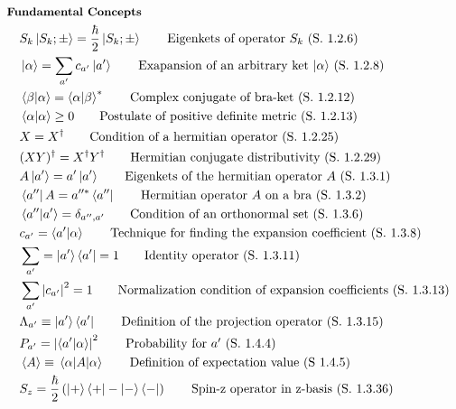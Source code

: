 \documentclass[10pt]{article}
\newcommand{\lrp}[1]{\left( #1 \right)}
\newcommand{\herm}[1]{#1^\dagger}
\begin{document}
\begin{multicols}{2}
	\tiny
	\setlength{\abovedisplayskip}{-25pt}
	\setlength{\belowdisplayskip}{0pt}
	\setlength{\abovedisplayshortskip}{0pt}
	\setlength{\belowdisplayshortskip}{0pt}
	\begin{align*}
	& \small \hspace{-10pt} \textbf{Fundamental Concepts} \small \\
		& S_k\ket{S_k;\pm} = \frac{\hbar}{2} \ket{S_k;\pm}	\tag*{Eigenkets of operator $S_k$	(S. 1.2.6)} \\
		& \ket{\alpha} = \sum_{a'} c_{a'} \ket{a'}	\tag*{Exapansion of an arbitrary ket $\ket{\alpha}$ (S. 1.2.8)} \\
		& \braket{\beta}{\alpha} = \braket{\alpha}{\beta}^*	\tag*{Complex conjugate of bra-ket (S. 1.2.12)} \\
		& \braket{\alpha}{\alpha} \geq 0	\tag*{Postulate of positive definite metric (S. 1.2.13)} \\
		& X = \herm{X}	\tag*{Condition of a hermitian operator (S. 1.2.25)} \\
		& \herm{(X Y)} = \herm{X} \herm{Y}	\tag*{Hermitian conjugate distributivity (S. 1.2.29)} \\
		& A \ket{a'} = a' \ket{a'}	\tag*{Eigenkets of the hermitian operator $A$ (S. 1.3.1)} \\
		& \bra{a''}A = a''^* \bra{a''}	\tag*{Hermitian operator $A$ on a bra (S. 1.3.2)} \\
		& \braket{a''}{a'} = \delta_{a'',a'} 	\tag*{Condition of an orthonormal set (S. 1.3.6)} \\
		& c_{a'} = \braket{a'}{\alpha}	\tag*{Technique for finding the expansion coefficient (S. 1.3.8)} \\
		& \sum_{a'} = \ket{a'} \bra{a'} = 1		\tag*{Identity operator (S. 1.3.11)} \\
		& \sum_{a'} \left| c_{a'} \right|^2 = 1		\tag*{Normalization condition of expansion coefficients (S. 1.3.13)} \\
		& \Lambda_{a'} \equiv \ket{a'}\bra{a'}	\tag*{Definition of the projection operator (S. 1.3.15)} \\
		& P_{a'} = \left|\braket{a'}{\alpha}\right|^2	\tag*{Probability for $a'$ (S. 1.4.4)} \\
		& \expval{A} \equiv \expval{A}{\alpha}	\tag*{Definition of expectation value (S 1.4.5)} \\
		& S_z = \frac{\hbar}{2} \lrp{\ket{+} \bra{+} - \ket{-} \bra{-}}		\tag*{Spin-z operator in z-basis (S. 1.3.36)} \\

\end{align*}
\end{multicols}
\end{document}
